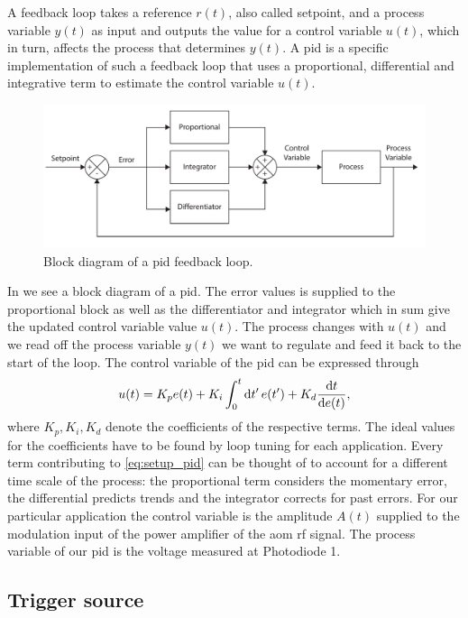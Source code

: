 A feedback loop takes a reference $r(t)$, also called setpoint, and a process
variable $y(t)$ as input and outputs the value for a control variable $u(t)$,
which in turn, affects the process that determines $y(t)$. A \gls{pid} is
a specific implementation of such a feedback loop that uses a proportional,
differential and integrative term to estimate the control variable $u(t)$.
\begin{figure}[htb]
  \centering
  \includegraphics[width=\textwidth]{../figure/setup/pid-controller.pdf}
  \caption{Block diagram of a \gls{pid} feedback loop.
  }\label{fig:setup_pid}
\end{figure}
In  we see a block diagram of a \gls{pid}. The error
values is supplied to the proportional block as well as the differentiator
and integrator which in sum give the updated control variable value $u(t)$.
The process changes with $u(t)$ and we read off the process variable $y(t)$
we want to regulate and feed it back to the start of the loop. The control
variable of the \gls{pid} can be expressed through
\begin{equation}
  u(t)
  =
  K_p e(t)+
  K_i \int_0^t \dd{t^\prime} e(t^\prime)+
  K_d \dv{t}{e(t)}
  \label{eq:setup_pid},
\end{equation}
where $K_p,K_i,K_d$ denote the coefficients of the respective terms. The ideal
values for the coefficients have to be found by loop tuning for each
application. Every term contributing to \cref{eq:setup_pid} can be thought
of to account for a different time scale of the process: the proportional term
considers the momentary error, the differential predicts trends and the
integrator corrects for past errors. For our particular application the
control variable is the amplitude $A(t)$ supplied to the modulation input
of the power amplifier of the \gls{aom} \gls{rf} signal. The process variable
of our \gls{pid} is the voltage measured at Photodiode \num{1}.

\subsection{Trigger source}

